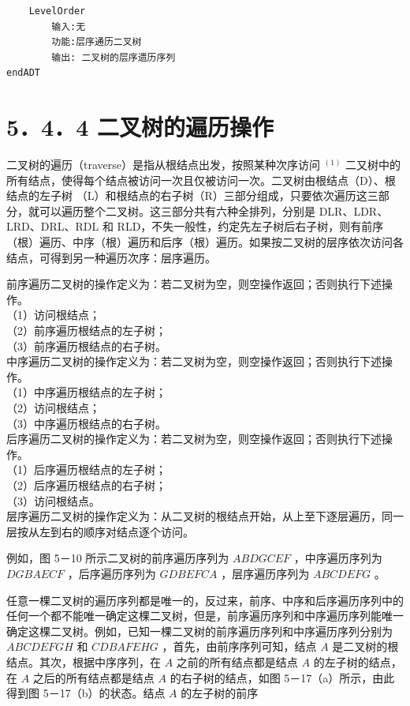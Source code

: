 \documentclass[10pt]{article}
\begin{document}
\begin{verbatim}
    LevelOrder
        输入:无
        功能:层序通历二叉树
        输出: 二叉树的层序遗历序列
endADT
\end{verbatim}

\section*{5．4．4 二叉树的遍历操作}
二叉树的遍历（traverse）是指从根结点出发，按照某种次序访问 ${ }^{(1)}$ 二又树中的所有结点，使得每个结点被访问一次且仅被访问一次。二叉树由根结点（D）、根结点的左子树 （L）和根结点的右子树（R）三部分组成，只要依次遍历这三部分，就可以遍历整个二叉树。这三部分共有六种全排列，分别是 DLR、LDR、LRD、DRL、RDL 和 RLD，不失一般性，约定先左子树后右子树，则有前序（根）遍历、中序（根）遍历和后序（根）遍历。如果按二叉树的层序依次访问各结点，可得到另一种遍历次序：层序遍历。

前序遍历二叉树的操作定义为：若二叉树为空，则空操作返回；否则执行下述操作。\\
（1）访问根结点；\\
（2）前序遍历根结点的左子树；\\
（3）前序遍历根结点的右子树。\\
中序遍历二叉树的操作定义为：若二叉树为空，则空操作返回；否则执行下述操作。\\
（1）中序遍历根结点的左子树；\\
（2）访问根结点；\\
（3）中序遍历根结点的右子树。\\
后序遍历二叉树的操作定义为：若二叉树为空，则空操作返回；否则执行下述操作。\\
（1）后序遍历根结点的左子树；\\
（2）后序遍历根结点的右子树；\\
（3）访问根结点。\\
层序遍历二叉树的操作定义为：从二叉树的根结点开始，从上至下逐层遍历，同一层按从左到右的顺序对结点逐个访问。

例如，图 5－10 所示二叉树的前序遍历序列为 $A B D G C E F$ ，中序遍历序列为 $D G B A E C F$ ，后序遍历序列为 $G D B E F C A$ ，层序遍历序列为 $A B C D E F G$ 。

任意一棵二叉树的遍历序列都是唯一的，反过来，前序、中序和后序遍历序列中的任何一个都不能唯一确定这棵二叉树，但是，前序遍历序列和中序遍历序列能唯一确定这棵二叉树。例如，已知一棵二叉树的前序遍历序列和中序遍历序列分别为 $A B C D E F G H$ 和 $C D B A F E H G$ ，首先，由前序序列可知，结点 $A$ 是二叉树的根结点。其次，根据中序序列，在 $A$ 之前的所有结点都是结点 $A$ 的左子树的结点，在 $A$ 之后的所有结点都是结点 $A$ 的右子树的结点，如图 5－17（a）所示，由此得到图 5－17（b）的状态。结点 $A$ 的左子树的前序
\end{document}
